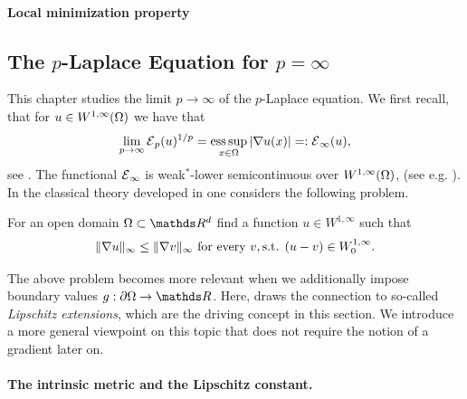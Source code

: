 \paragraph*{Local minimization property}
%
%
\subsection{The $p$-Laplace Equation for $p=\infty$}\label{sec:InfLip}
%
%
This chapter studies the limit $p\to\infty$ of the $p$-Laplace equation. We first recall, that for 
$u\in W^{1,\infty}(\Omega)$ we have that
%
\begin{align*}
\lim_{p\to\infty} \mathcal{E}{}_p(u)^{1/p} = \operatorname*{ess\,sup}_{x\in\Omega} \left|\nabla u(x)\right| =: \mathcal{E}{}_\infty(u),
\end{align*}
%
see \cite{jensen1993uniqueness}. The functional $\mathcal{E}{}_\infty$ is weak$^*$-lower semicontinuous over $W^{1,\infty}(\Omega)$, 
(see e.g. \cite[Thm. 2.6]{barron2001lower}). In the classical theory developed in \cite{jensen1993uniqueness} one considers the following 
problem.
%
\begin{problem}{}{}
For an open domain $\domain\subset\R^d$ find a function $u\in W^{1,\infty}$ such that
%
\begin{align*}
\|\nabla u\|_\infty \leq \|\nabla v\|_\infty \text{ for every } v, \text{s.t. } (u-v)\in W^{1,\infty}_0.
\end{align*}
\end{problem}
%
The above problem becomes more relevant when we additionally impose boundary values $g:\partial\domain\to\R$. Here, 
\cite{jensen1993uniqueness} draws the connection to so-called \emph{Lipschitz extensions}, which are the driving 
concept in this section. We introduce a more general viewpoint on this topic that does not require the notion of a gradient later on. 

\paragraph{The intrinsic metric and the Lipschitz constant.}

